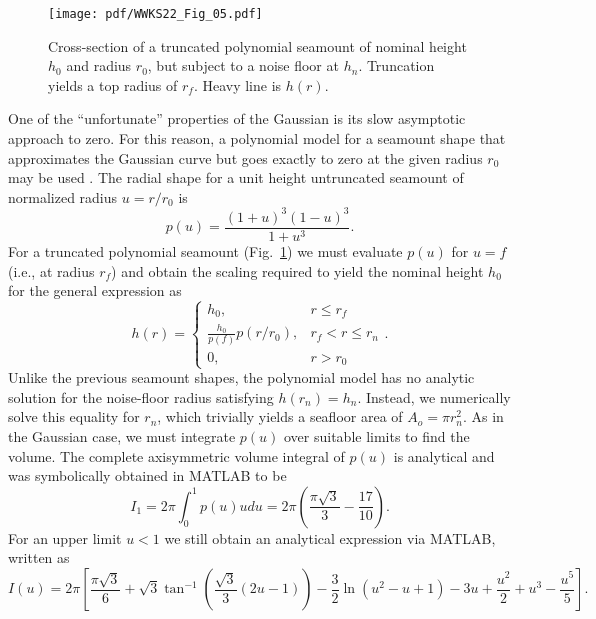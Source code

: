 \begin{figure}
\centering
\texttt{[image: pdf/WWKS22\_Fig\_05.pdf]}
\caption{Cross-section of a truncated polynomial seamount of nominal height $h_0$ and radius
$r_0$, but subject to a noise floor at $h_n$.  Truncation yields a top radius of $r_f$. Heavy line is $h(r)$.}
\label{WWKS22_Fig_05}
\end{figure}
One of the ``unfortunate'' properties of the Gaussian is its slow asymptotic approach to zero. For this reason,
a polynomial model for a seamount shape that approximates the Gaussian curve but goes exactly to zero at the
given radius $r_0$ may be used \citep[e.g.,~][]{KW2011}.  The radial shape for a unit height untruncated seamount
of normalized radius $u = r/r_0$ is
\begin{equation*}
	p(u) = \frac{(1+u)^3(1-u)^3}{1+u^3}.
\end{equation*}
For a truncated polynomial seamount (Fig.~\ref{WWKS22_Fig_05}) we must evaluate $p(u)$ for $u = f$ (i.e., at radius $r_f$)
and obtain the scaling required to yield the nominal height $h_0$ for the general expression as
\begin{equation*}
h(r) = \left \{ \begin{array}{cl} 
	h_0, & r \leq r_f \\
	\frac{h_0}{p(f)} p(r/r_0), & r_f < r \leq r_n \\
	0, & r > r_0
\end{array} \right..
\end{equation*}
Unlike the previous seamount shapes, the polynomial model has no analytic solution for the noise-floor
radius satisfying $h(r_n) = h_n$.  Instead, we numerically solve this equality for $r_n$, which
trivially yields a seafloor area of $A_o = \pi r_n^2$.
As in the Gaussian case, we must integrate $p(u)$ over suitable limits to find the volume.
The complete axisymmetric volume integral of $p(u)$ is analytical and was symbolically obtained
in MATLAB to be
\begin{equation*}
I_1 = 2\pi\int_0^1 p(u) udu = 2 \pi \left (\frac{\pi \sqrt{3}}{3} - \frac{17}{10} \right ).
\end{equation*}
For an upper limit $u < 1$ we still obtain an analytical expression via MATLAB, written as
\begin{equation*}
	I(u) = 2\pi \left [ \frac{\pi \sqrt{3}}{6} + \sqrt{3} \tan^{-1} \left( \frac{\sqrt{3}}{3}(2u - 1) \right ) - \frac{3}{2}\ln (u^2 - u + 1) - 3u + \frac{u^2}{2} + u^3 - \frac{u^5}{5} \right ].
\end{equation*}
